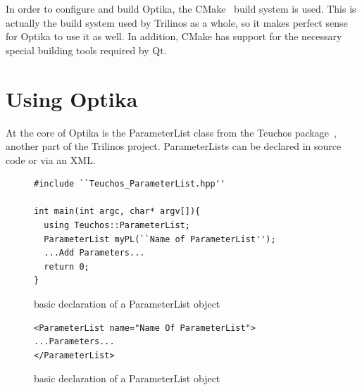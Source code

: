 In order to configure and build Optika, the CMake~\cite{cmake} build system is used. This is actually the build system
used by Trilinos as a whole, so it makes perfect sense for Optika to use it as well. In addition, CMake
has support for the necessary special building tools required by Qt.

\section{Using Optika}
At the core of Optika is the ParameterList class from the Teuchos package~\cite{TeuchosPackage}, another part
of the Trilinos project. ParameterLists can be declared in source code or via an XML.
\begin{figure}
\centering
\begin{lstlisting}
#include ``Teuchos_ParameterList.hpp''

int main(int argc, char* argv[]){
  using Teuchos::ParameterList;
  ParameterList myPL(``Name of ParameterList'');
  ...Add Parameters...
  return 0;
}
\end{lstlisting}

\label{simplePLCode}
\caption[Basic ParameterList]{basic declaration of a ParameterList object}
\end{figure}
\begin{figure}
\centering
\begin{lstlisting}
<ParameterList name="Name Of ParameterList">
...Parameters...
</ParameterList>
\end{lstlisting}

\label{simplePLXML}
\caption[Basic ParameterList]{basic declaration of a ParameterList object}
\end{figure}

